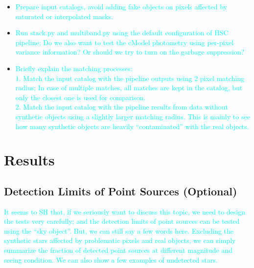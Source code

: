 \documentclass[preprint]{aastex}
\newcommand{\plan}[1]{\textcolor{cyan}{#1}}
\begin{document}
    \begin{itemize}
        \item \plan{Prepare input catalogs, avoid adding fake objects on pixels affected 
                    by saturated or interpolated masks.} 
        \item \plan{Run stack.py and multiband.py using the default configuration of 
                    HSC pipeline; Do we also want to test the cModel photometry using 
                    per-pixel variance information?  Or should we try to turn on the 
                    garbage suppression?}
        \item \plan{Briefly explain the matching processes: \\
                    1. Match the input catalog with the pipeline outputs using 2 pixel 
                       matching radius; In case of multiple matches, all matches are kept 
                       in the catalog, but only the closest one is used for comparison. \\
                    2. Match the input catalog with the pipeline results from data without 
                       synthetic objects using a slightly larger matching radius.  This is 
                       mainly to see how many synthetic objects are heavily ``contaminated''
                       with the real objects.}
    \end{itemize}


\section{Results}

\subsection{Detection Limits of Point Sources (Optional)}

    \plan{It seems to SH that, if we seriously want to discuss this topic, we need to 
          design the tests very carefully; and the detection limits of point sources can 
          be tested using the ``sky object''. 
          But, we can still say a few words here.  Excluding the synthetic stars affected 
          by problematic pixels and real objects, we can simply summarize the fraction of 
          detected point sources at different magnitude and seeing condition.  
          We can also show a few examples of undetected stars.}
    
\end{document}
